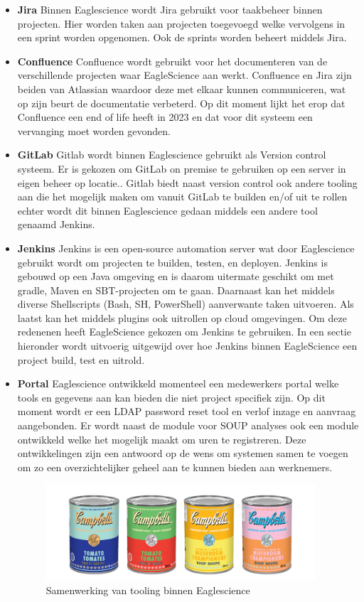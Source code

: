 \begin{itemize}
    \item \textbf{Jira}
    Binnen Eaglescience wordt Jira gebruikt voor taakbeheer binnen projecten. Hier worden taken aan projecten toegevoegd welke vervolgens in een sprint worden opgenomen. Ook de sprints worden beheert middels Jira.
    \item \textbf{Confluence}
    Confluence wordt gebruikt voor het documenteren van de verschillende projecten waar EagleScience aan werkt. Confluence en Jira zijn beiden van Atlassian waardoor deze met elkaar kunnen communiceren, wat op zijn beurt de documentatie verbeterd. Op dit moment lijkt het erop dat Confluence een end of life heeft in 2023 en dat voor dit systeem een vervanging moet worden gevonden.
    \item \textbf{GitLab}
    Gitlab wordt binnen Eaglescience gebruikt als Version control systeem. Er is gekozen om GitLab on premise te gebruiken op een server in eigen beheer op locatie.. Gitlab biedt naast version control ook andere tooling aan die het mogelijk maken om vanuit GitLab te builden en/of uit te rollen echter wordt dit binnen Eaglescience gedaan middels een andere tool genaamd Jenkins.
    \item \textbf{Jenkins}
    Jenkins is een open-source automation server wat door Eaglescience gebruikt wordt om projecten te builden, testen, en deployen. Jenkins is gebouwd op een Java omgeving en is daarom uitermate geschikt om met gradle, Maven en SBT-projecten om te gaan. Daarnaast kan het middels diverse Shellscripts (Bash, SH, PowerShell) aanverwante taken uitvoeren. Als laatst kan het middels plugins ook uitrollen op cloud omgevingen. Om deze redenenen heeft EagleScience gekozen om Jenkins te gebruiken. In een sectie hieronder wordt uitvoerig uitgewijd over hoe Jenkins binnen EagleScience een project build, test en uitrold.
    \item \textbf{Portal}
    Eaglescience ontwikkeld momenteel een medewerkers portal welke tools en gegevens aan kan bieden die niet project specifiek zijn. Op dit moment wordt er een LDAP password reset tool en verlof inzage en aanvraag aangebonden. Er wordt naast de module voor SOUP analyses ook een module ontwikkeld welke het mogelijk maakt om uren te registreren. Deze ontwikkelingen zijn een antwoord op de wens om systemen samen te voegen om zo een overzichtelijker geheel aan te kunnen bieden aan werknemers.

    \begin{figure}
        \centering
        \includegraphics[width=10cm]{gfx/soupcans}
        \caption{Samenwerking van tooling binnen Eaglescience}
        \label{fig:es-tooling}
    \end{figure}

\end{itemize}



